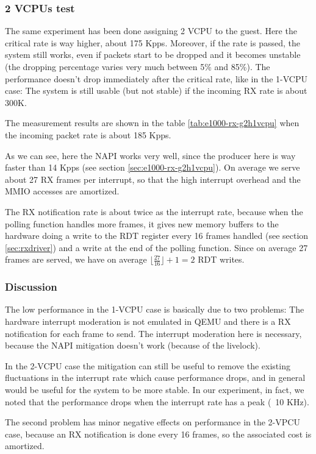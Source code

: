 \subsubsection{2 VCPUs test}
The same experiment has been done assigning 2 VCPU to the guest. Here the critical rate is way higher, about 175 Kpps. Moreover,
if the rate is passed, the system still works, even if packets start to be dropped and it becomes unstable (the dropping percentage
varies very much between 5\% and 85\%). The performance doesn't drop immediately after the critical rate, like in the 1-VCPU case: The system
is still usable (but not stable) if the incoming RX rate is about 300K.

The measurement results are shown in the table \ref{tab:e1000-rx-g2h1vcpu} when the incoming packet rate is about 185 Kpps.

As we can see, here the NAPI works very well, since the producer here is way faster than 14 Kpps (see section \ref{sec:e1000-rx-g2h1vcpu}).
On average we serve about 27 RX frames per interrupt, so that the high interrupt overhead and the MMIO accesses are amortized.

The RX notification rate is about twice as the interrupt rate, because when the polling function handles more frames, it gives new memory
buffers to the hardware doing a write to the RDT register every 16 frames handled (see section \ref{sec:rxdriver}) and a write at the end
of the polling function. Since on average 27 frames are served, we have on average $\lfloor \frac{27}{16} \rfloor + 1 = 2$ RDT writes.


\subsubsection{Discussion}
The low performance in the 1-VCPU case is basically due to two problems: The hardware interrupt moderation is not emulated in QEMU and
there is a RX notification for each frame to send. The interrupt moderation here is necessary, because the NAPI mitigation doesn't work
(because of the livelock).

In the 2-VCPU case the mitigation can still be useful to remove the existing fluctuations in the interrupt rate which cause performance
drops, and in general would be useful for the system to be more stable. In our experiment, in fact, we noted that the performance drops
when the interrupt rate has a peak (~10 KHz).

The second problem has minor negative effects on performance in the 2-VPCU case, because an RX notification is done every
16 frames, so the associated cost is amortized.

